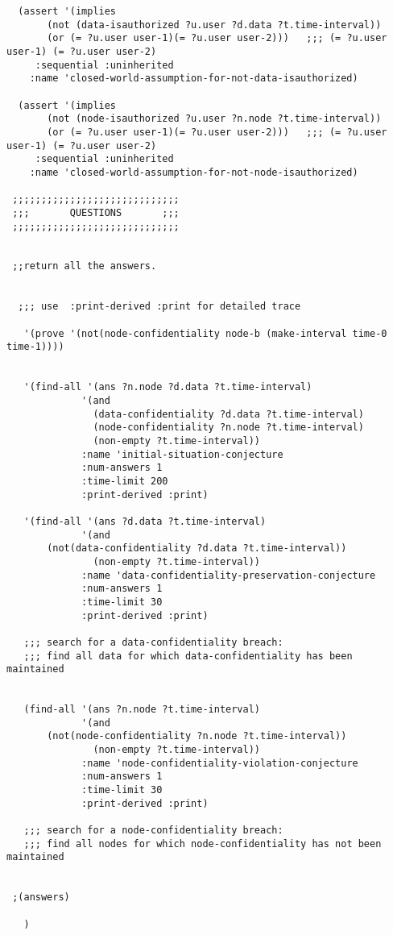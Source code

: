 \begin{lstlisting}
  (assert '(implies
       (not (data-isauthorized ?u.user ?d.data ?t.time-interval))
       (or (= ?u.user user-1)(= ?u.user user-2)))   ;;; (= ?u.user user-1) (= ?u.user user-2)
     :sequential :uninherited
    :name 'closed-world-assumption-for-not-data-isauthorized)

  (assert '(implies
       (not (node-isauthorized ?u.user ?n.node ?t.time-interval))
       (or (= ?u.user user-1)(= ?u.user user-2)))   ;;; (= ?u.user user-1) (= ?u.user user-2)
     :sequential :uninherited
    :name 'closed-world-assumption-for-not-node-isauthorized)

 ;;;;;;;;;;;;;;;;;;;;;;;;;;;;;
 ;;;       QUESTIONS       ;;;
 ;;;;;;;;;;;;;;;;;;;;;;;;;;;;;


 ;;return all the answers.


  ;;; use  :print-derived :print for detailed trace

   '(prove '(not(node-confidentiality node-b (make-interval time-0 time-1))))


   '(find-all '(ans ?n.node ?d.data ?t.time-interval)
             '(and
               (data-confidentiality ?d.data ?t.time-interval)
               (node-confidentiality ?n.node ?t.time-interval)
               (non-empty ?t.time-interval))
             :name 'initial-situation-conjecture
             :num-answers 1
             :time-limit 200
             :print-derived :print)

   '(find-all '(ans ?d.data ?t.time-interval)
             '(and
       (not(data-confidentiality ?d.data ?t.time-interval))
               (non-empty ?t.time-interval))
             :name 'data-confidentiality-preservation-conjecture
             :num-answers 1
             :time-limit 30 
             :print-derived :print)

   ;;; search for a data-confidentiality breach:
   ;;; find all data for which data-confidentiality has been maintained


   (find-all '(ans ?n.node ?t.time-interval)
             '(and
       (not(node-confidentiality ?n.node ?t.time-interval))
               (non-empty ?t.time-interval))
             :name 'node-confidentiality-violation-conjecture
             :num-answers 1
             :time-limit 30 
             :print-derived :print)

   ;;; search for a node-confidentiality breach:
   ;;; find all nodes for which node-confidentiality has not been maintained

  
 ;(answers)

   )
\end{lstlisting}